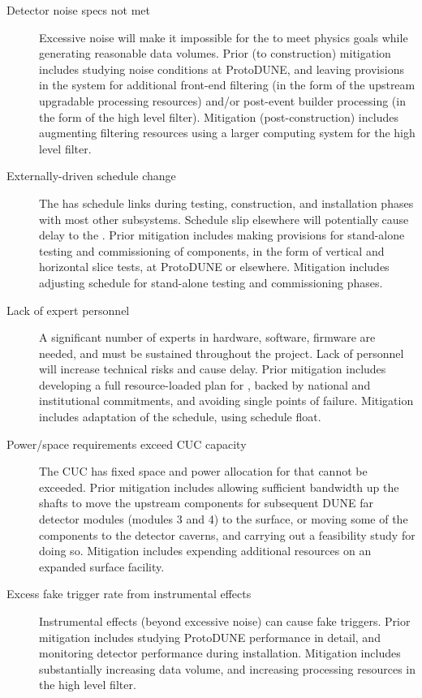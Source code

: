 \begin{description}
\item[Detector noise specs not met] Excessive noise will make it
  impossible for the  to meet physics goals while
  generating reasonable data volumes. Prior (to construction) mitigation includes
  studying noise conditions at ProtoDUNE, and leaving provisions in the
  system for additional front-end filtering (in the form of the
  upstream  upgradable processing resources) and/or post-event builder processing (in
  the form of the high level filter). Mitigation (post-construction) includes augmenting
  filtering resources using a larger computing system for the high
  level filter.

\item[Externally-driven schedule change] The  has schedule links during
  testing, construction, and installation phases with most other
  subsystems. Schedule slip elsewhere will potentially cause
  delay to the . Prior mitigation includes making provisions for
  stand-alone testing and commissioning of  components, in the form
  of vertical and horizontal slice tests, at ProtoDUNE or
  elsewhere. Mitigation includes adjusting schedule for stand-alone
  testing and commissioning phases. 

\item[Lack of expert personnel] A significant number of experts in
  hardware, software, firmware are needed, and must be sustained
  throughout the project. Lack of personnel will increase technical
  risks and cause delay. Prior mitigation includes developing a full
  resource-loaded plan for , backed by national and institutional
  commitments, and avoiding single points of failure. Mitigation
  includes adaptation of the  schedule, using schedule float.

\item[Power/space requirements exceed CUC capacity] The CUC has fixed
  space and power allocation for  
that cannot be exceeded.  Prior mitigation includes allowing
sufficient bandwidth up the shafts to move the upstream  components for
subsequent DUNE far detector modules (modules 3 and 4) to the
surface, or moving some of the  components to the detector caverns,
and carrying out a feasibility study for doing so. 
Mitigation includes expending additional resources on an
expanded surface facility.

\item[Excess fake trigger rate from instrumental effects] Instrumental
  effects (beyond excessive noise) can cause fake triggers. Prior
  mitigation includes studying ProtoDUNE performance in detail, and monitoring detector
  performance during installation. Mitigation includes substantially increasing
  data volume, and increasing processing resources in the high level
  filter.


\end{description}

